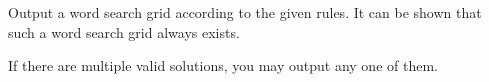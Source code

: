 
  Output a word search grid according to the given rules.
  It can be shown that such a word search grid always exists.

  If there are multiple valid solutions, you may output any one of them.
